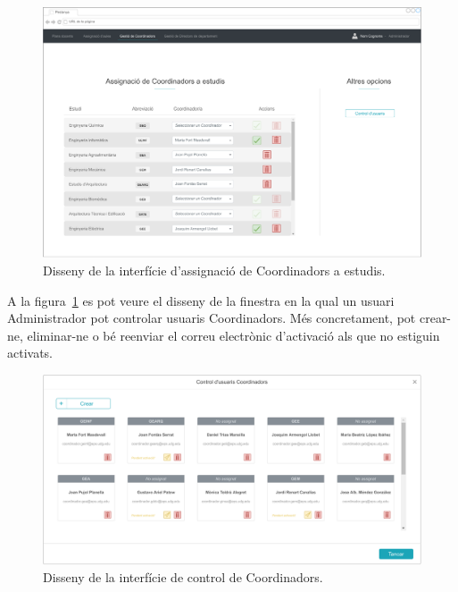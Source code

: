 \documentclass[a4paper,12pt]{ThesisStyle}
\begin{document}
\begin{figure}[H]
	\centering
	\includegraphics[width=\textwidth]{assets/interfaces/usuaris/assignacio.pdf}
	\caption{\label{img:usuaris_assignacio}Disseny de la interfície d'assignació de Coordinadors a estudis.}
\end{figure}

A la figura~\ref{img:usuaris_assignacio} es pot veure el disseny de la finestra en la qual un usuari Administrador pot controlar usuaris Coordinadors. Més concretament, pot crear-ne, eliminar-ne o bé reenviar el correu electrònic d'activació als que no estiguin activats.
\begin{figure}[H]
	\centering
	\includegraphics[width=\textwidth]{assets/interfaces/usuaris/control.pdf}
	\caption{\label{img:usuaris_control}Disseny de la interfície de control de Coordinadors.}
\end{figure}
\end{document}
